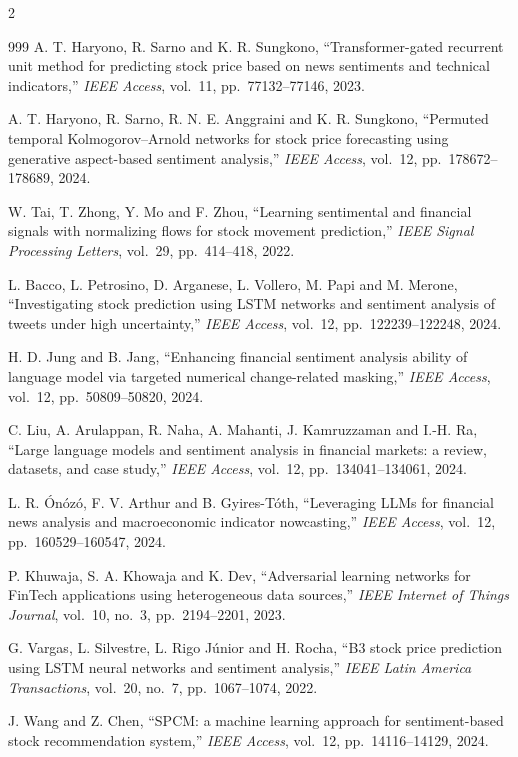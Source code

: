 \begin{footnotesize}
\begin{multicols}{2}
\begin{thebibliography}{999}
 A. T. Haryono, R. Sarno and K. R. Sungkono, ``Transformer-gated recurrent
unit method for predicting stock price based on news sentiments and technical indicators,''
\emph{IEEE Access}, vol.~11, pp.~77132--77146, 2023.

 A. T. Haryono, R. Sarno, R. N. E. Anggraini and K. R. Sungkono, ``Permuted
temporal Kolmogorov--Arnold networks for stock price forecasting using generative aspect-based
sentiment analysis,'' \emph{IEEE Access}, vol.~12, pp.~178672--178689, 2024.

 W. Tai, T. Zhong, Y. Mo and F. Zhou, ``Learning sentimental and financial
signals with normalizing flows for stock movement prediction,'' \emph{IEEE Signal Processing
Letters}, vol.~29, pp.~414--418, 2022.

 L. Bacco, L. Petrosino, D. Arganese, L. Vollero, M. Papi and M. Merone,
``Investigating stock prediction using LSTM networks and sentiment analysis of tweets under high
uncertainty,'' \emph{IEEE Access}, vol.~12, pp.~122239--122248, 2024.

 H. D. Jung and B. Jang, ``Enhancing financial sentiment analysis ability of
language model via targeted numerical change-related masking,'' \emph{IEEE Access}, vol.~12,
pp.~50809--50820, 2024.

 C. Liu, A. Arulappan, R. Naha, A. Mahanti, J. Kamruzzaman and I.-H.
Ra, ``Large language models and sentiment analysis in financial markets: a review, datasets, and
case study,'' \emph{IEEE Access}, vol.~12, pp.~134041--134061, 2024.

 L. R. \'On\'oz\'o, F. V. Arthur and B. Gyires-T\'oth, ``Leveraging LLMs for
financial news analysis and macroeconomic indicator nowcasting,'' \emph{IEEE Access}, vol.~12,
pp.~160529--160547, 2024.

 P. Khuwaja, S. A. Khowaja and K. Dev, ``Adversarial learning networks for
FinTech applications using heterogeneous data sources,'' \emph{IEEE Internet of Things Journal},
vol.~10, no.~3, pp.~2194--2201, 2023.

 G. Vargas, L. Silvestre, L. Rigo J\'unior and H. Rocha, ``B3 stock price
prediction using LSTM neural networks and sentiment analysis,'' \emph{IEEE Latin America
Transactions}, vol.~20, no.~7, pp.~1067--1074, 2022.

 J. Wang and Z. Chen, ``SPCM: a machine learning approach for
sentiment-based stock recommendation system,'' \emph{IEEE Access}, vol.~12, pp.~14116--14129,
2024.


\end{thebibliography}
\end{multicols}
\end{footnotesize}
